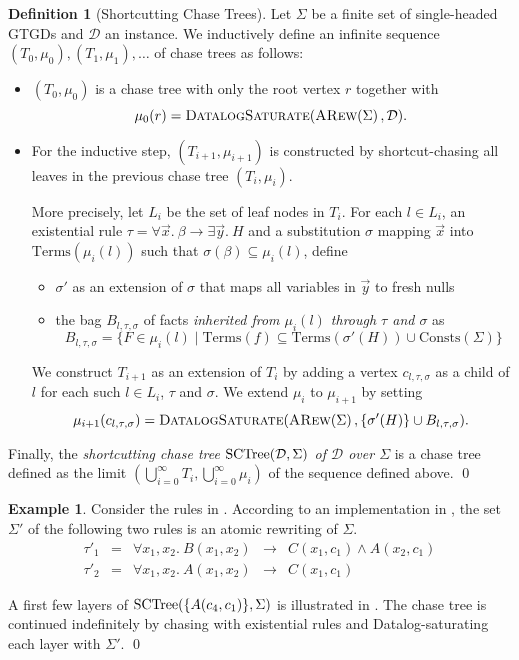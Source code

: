 \documentclass[12pt]{report}
\theoremstyle{plain}
\theoremstyle{definition}
\newtheorem{definition}[theorem]{Definition}
\newtheorem{example}[theorem]{Example}
\def\Consts{{\mathrm{Consts}}}
\def\Terms{{\mathrm{Terms}}}
\newcommand{\ARew}[1]{\ensuremath{\normalfont{\textsc{ARew}}\!\left( #1 \right)}}
\newcommand{\SCTree}[2]{\ensuremath{\normalfont{\textrm{SCTree}}\!\left( #1, #2 \right)}}
\begin{document}
\begin{definition}[Shortcutting Chase Trees]
  Let $\Sigma$ be a finite set of single-headed GTGDs and $\mathcal{D}$ an instance. We inductively define an infinite sequence $(T_0, \mu_0), (T_1, \mu_1), \ldots$ of chase trees as follows:
  \begin{itemize}
    \item $(T_0, \mu_0)$ is a chase tree with only the root vertex $r$ together with $$\mu_0(r) = \textsc{DatalogSaturate}(\ARew{\Sigma}, \mathcal{D}).$$
    \item For the inductive step, $(T_{i + 1}, \mu_{i + 1})$ is constructed by shortcut-chasing all leaves in the previous chase tree $(T_i, \mu_i)$.
    
    More precisely, let $L_i$ be the set of leaf nodes in $T_i$. For each $l \in L_i$, an existential rule $\tau = \forall \vec{x}.\ \beta \rightarrow \exists \vec{y}.\ H$ and a substitution $\sigma$ mapping $\vec{x}$ into $\Terms(\mu_i(l))$ such that $\sigma(\beta) \subseteq \mu_i(l)$, define
    \begin{itemize}
      \item $\sigma'$ as an extension of $\sigma$ that maps all variables in $\vec{y}$ to fresh nulls
      \item the bag $B_{l, \tau, \sigma}$ of facts \emph{inherited from $\mu_i(l)$ through $\tau$ and $\sigma$} as $$B_{l, \tau, \sigma} = \{ F \in \mu_i(l) \mid \Terms(f) \subseteq \Terms(\sigma'(H)) \cup \Consts(\Sigma) \}$$
    \end{itemize}
    We construct $T_{i+1}$ as an extension of $T_i$ by adding a vertex $c_{l, \tau, \sigma}$ as a child of $l$ for each such $l \in L_i$, $\tau$ and $\sigma$. We extend $\mu_i$ to $\mu_{i+1}$ by setting $$\mu_{i+1}(c_{l, \tau, \sigma}) = \textsc{DatalogSaturate}(\ARew{\Sigma}, \{ \sigma'(H) \} \cup B_{l, \tau, \sigma}).$$
  \end{itemize}
  Finally, the \emph{shortcutting chase tree $\SCTree{\mathcal{D}}{\Sigma}$ of $\mathcal{D}$ over $\Sigma$} is a chase tree defined as the limit $(\bigcup_{i = 0}^\infty T_i, \bigcup_{i = 0}^\infty \mu_i)$ of the sequence defined above.
  \qed
\end{definition}

\begin{example}
  Consider the rules in . According to an implementation in \cite{Benedikt_Rewriting_the_Infinite}, the set $\Sigma'$ of the following two rules is an atomic rewriting of $\Sigma$.
  \[\begin{array}{ccrcl}
    \tau'_1 & = & \forall x_1, x_2.\ B(x_1, x_2) & \rightarrow & C(x_1, c_1) \wedge A(x_2, c_1) \\
    \tau'_2 & = & \forall x_1, x_2.\ A(x_1, x_2) & \rightarrow & C(x_1, c_1)
  \end{array}\]

  A first few layers of $\SCTree{\{ A(c_4, c_1) \}}{\Sigma}$ is illustrated in . The chase tree is continued indefinitely by chasing with existential rules and Datalog-saturating each layer with $\Sigma'$.
  \qed
\end{example}
\end{document}
